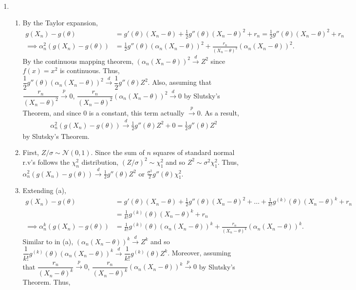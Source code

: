 \documentclass[12pt]{article}
\begin{document}
\begin{enumerate}
\begin{enumerate}
    \end{enumerate}
    \item
    \begin{enumerate}
        \item By the Taylor expansion,
        \begin{align*}
            g(X_n) - g(\theta) &= g'(\theta)(X_n-\theta) + \frac{1}{2}g''(\theta)(X_n-\theta)^2 + r_n = \frac{1}{2}g''(\theta)(X_n-\theta)^2 + r_n\\
            \implies \alpha_n^2(g(X_n) - g(\theta)) &= \frac{1}{2}g''(\theta)(\alpha_n(X_n-\theta))^2 + \frac{r_n}{(X_n-\theta)^2}(\alpha_n(X_n-\theta))^2.
        \end{align*} By the continuous mapping theorem, $(\alpha_n(X_n-\theta))^2 \overset{d}{\to} Z^2$ since $f(x) = x^2$ is continuous. Thus, $\dfrac{1}{2}g''(\theta)(\alpha_n(X_n-\theta))^2 \overset{d}{\to} \dfrac{1}{2}g''(\theta)Z^2$. Also, assuming that $\dfrac{r_n}{(X_n-\theta)^2} \overset{p}{\to} 0$, $\dfrac{r_n}{(X_n-\theta)^2}(\alpha_n(X_n-\theta))^2 \overset{d}{\to} 0$ by Slutsky's Theorem, and since 0 is a constant, this term actually $\overset{p}{\to} 0$. As a result,
        \begin{align*}
            \alpha_n^2(g(X_n) - g(\theta)) \overset{d}{\to} \frac{1}{2}g''(\theta)Z^2 + 0 = \frac{1}{2}g''(\theta)Z^2
        \end{align*} by Slutsky's Theorem.
        \item First, $Z/\sigma \sim \mathcal{N}(0,1)$. Since the sum of $n$ squares of standard normal r.v's follows the $\chi^2_n$ distribution, $(Z/\sigma)^2 \sim \chi^2_1$ and so $Z^2 \sim \sigma^2\chi^2_1$. Thus, $\alpha_n^2(g(X_n) - g(\theta)) \overset{d}{\to} \frac{1}{2}g''(\theta)Z^2$ or $\frac{\sigma^2}{2}g''(\theta)\chi^2_1$.
        \item Extending (a),
        \begin{align*}
            g(X_n) - g(\theta) &= g'(\theta)(X_n-\theta) + \frac{1}{2}g''(\theta)(X_n-\theta)^2 + \ldots + \frac{1}{k!}g^{(k)}(\theta)(X_n-\theta)^k + r_n\\
            &= \frac{1}{k!}g^{(k)}(\theta)(X_n-\theta)^k + r_n\\
            \implies \alpha_n^k(g(X_n) - g(\theta)) &= \frac{1}{k!}g^{(k)}(\theta)(\alpha_n(X_n-\theta))^k + \frac{r_n}{(X_n-\theta)^k}(\alpha_n(X_n-\theta))^k.
        \end{align*} Similar to in (a), $(\alpha_n(X_n-\theta))^k \overset{d}{\to} Z^k$ and so $\dfrac{1}{k!}g^{(k)}(\theta)(\alpha_n(X_n-\theta))^k \overset{d}{\to} \dfrac{1}{k!}g^{(k)}(\theta)Z^k$. Moreover, assuming that $\dfrac{r_n}{(X_n-\theta)^k} \overset{p}{\to} 0$, $\dfrac{r_n}{(X_n-\theta)^k}(\alpha_n(X_n-\theta))^k \overset{p}{\to} 0$ by Slutsky's Theorem. Thus,

\end{enumerate}
\end{enumerate}
\end{document}
